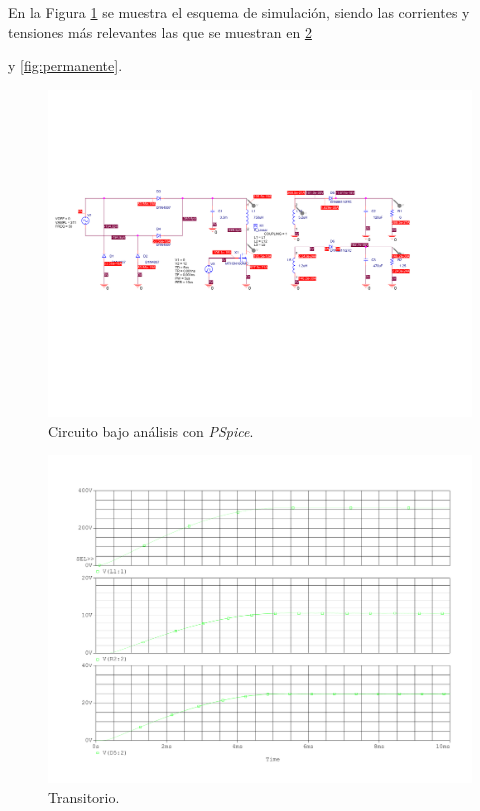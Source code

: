 En la Figura \ref{fig:esq} se muestra el esquema de simulación, siendo las corrientes y tensiones más relevantes las que se muestran en \ref{fig:transitorio}{ y \ref{fig:permanente}.

\begin{figure}[H]
	\centering
	\includegraphics[scale=0.5]{Figuras/1_esquematico.pdf}
	\caption{Circuito bajo análisis con \textit{PSpice}.}
	\label{fig:esq}
\end{figure}


\begin{figure}[H]
	\centering
	\includegraphics[scale=0.5]{Figuras/1_transitorio_con_rectificador.pdf}
	\caption{Transitorio.}
	\label{fig:transitorio}
\end{figure}

}
